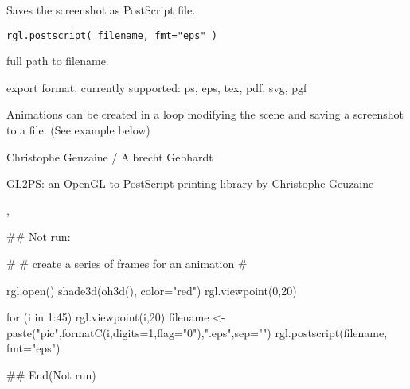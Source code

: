 \documentclass{article}
\begin{document}
\begin{Description}\relax
Saves the screenshot as PostScript file.
\end{Description}
\begin{Usage}
\begin{verbatim}
rgl.postscript( filename, fmt="eps" )
\end{verbatim}
\end{Usage}
\begin{Arguments}
\begin{ldescription}
\item[\code{filename}] full path to filename.
\item[\code{fmt}] export format, currently supported: ps, eps, tex, pdf, svg, pgf 
\end{ldescription}
\end{Arguments}
\begin{Details}\relax
Animations can be created in a loop modifying the scene and saving 
a screenshot to a file. (See example below)
\end{Details}
\begin{Author}\relax
Christophe Geuzaine / Albrecht Gebhardt
\end{Author}
\begin{References}\relax
GL2PS: an OpenGL to PostScript printing library by Christophe Geuzaine
\end{References}
\begin{SeeAlso}\relax
{}, 
\end{SeeAlso}
\begin{Examples}
\begin{ExampleCode}

## Not run: 

#
# create a series of frames for an animation
#

rgl.open()
shade3d(oh3d(), color="red")
rgl.viewpoint(0,20)

for (i in 1:45) {
  rgl.viewpoint(i,20)
  filename <- paste("pic",formatC(i,digits=1,flag="0"),".eps",sep="") 
  rgl.postscript(filename, fmt="eps")
}

## End(Not run)

\end{ExampleCode}
\end{Examples}
\end{document}
